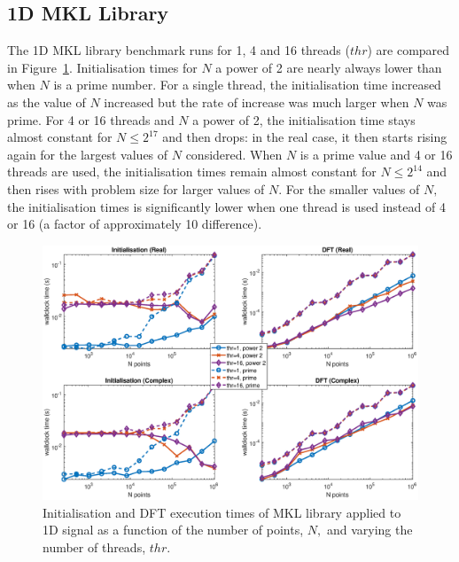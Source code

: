 \documentclass[a4paper]{article}
\begin{document}
\subsection{1D MKL Library}\label{Sec:1DMKL}

The 1D MKL library benchmark runs for 1, 4 and 16 threads ($thr$) are compared
in Figure~\ref{1DMKL}. Initialisation times for $N$ a power of 2 are
nearly always lower than when $N$ is a prime number. For a single
thread, the initialisation time increased as the value of $N$
increased but the rate of increase was much larger when $N$ was
prime. For 4 or 16 threads and $N$ a power of 2, the initialisation
time stays almost constant for $N\le 2^{17}$ and then drops: in the
real case, it then starts rising again for the largest values of $N$
considered. When $N$ is a prime value and 4 or 16 threads are used,
the initialisation times remain almost constant for $N\le 2^{14}$ and
then rises with problem size for larger values of $N.$ For the smaller
values of $N,$ the initialisation times is significantly lower when
one thread is used instead of 4 or 16 (a factor of approximately 10
difference).


\begin{figure}[!htb]
    \centering
    \includegraphics[width=0.9\linewidth]{../results/mkl_1d_thr.eps}
  \caption{Initialisation and DFT execution times of MKL library applied to 1D signal as a function of the
    number of points, $N,$ and varying the number of threads, $thr.$ }
  \label{1DMKL}
\end{figure}
\end{document}
